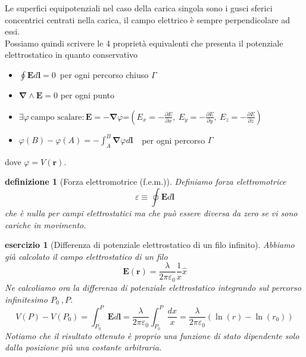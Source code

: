 \documentclass[10pt,a4paper]{article}
\newtheorem{esercizio}{esercizio}
\newtheorem{definizione}{definizione}
\begin{document}
Le superfici equipotenziali nel caso della carica singola sono i gusci sferici concentrici centrati nella carica, il campo elettrico è sempre perpendicolare ad essi.\\
Possiamo quindi scrivere le 4 proprietà equivalenti che presenta il potenziale elettrostatico in quanto conservativo
\begin{itemize}
	\item \(\oint \mathbf{E}d\mathbf{l} = 0 \)\ per ogni percorso chiuso $\Gamma$ 
	\item \(\mathbf{\nabla}\wedge\mathbf{E} = 0\) per ogni punto
	\item \(\exists\varphi\  \text{campo scalare} : \mathbf{E}=-\mathbf{\nabla}\varphi\)=$\left(E_x = -\frac{\partial E}{\partial x},\ E_y= - \frac{\partial E}{\partial y},\ E_z= -\frac{\partial E}{\partial z}\right)$
	\item \(\varphi(B)-\varphi(A) = -\int_{A}^{B}\mathbf{\nabla}\varphi d\mathbf{l}\ \) \ per ogni percorso $\Gamma$ 
\end{itemize}
dove $\varphi = V(\mathbf{r})$.
\begin{definizione}[Forza elettromotrice (f.e.m.)]
Definiamo forza elettromotrice
\[\varepsilon \equiv \oint \mathbf{E}d\mathbf{l}\]
che è nulla per campi elettrostatici ma che può essere diversa da zero se vi sono cariche in movimento.
\end{definizione}
\begin{esercizio}[Differenza di potenziale elettrostatico di un filo infinito]
Abbiamo già calcolato il campo elettrostatico di un filo
\[\mathbf{E}(\mathbf{r}) = \frac{\lambda}{2\pi\varepsilon_0}\frac{1}{x}\hat{x}\]
Ne calcoliamo ora la differenza di potenziale elettrostatico integrando sul percorso infinitesimo \(P_0\ , P\). 
\[V(P)-V(P_0) = \int_{P_0}^{P}\mathbf{E}d\mathbf{l} = \frac{\lambda}{2\pi\varepsilon_0} \int_{P_0}^{P}\frac{dx}{x}= \frac{\lambda}{2\pi\varepsilon_0} \left(\ln(r)-\ln(r_0)\right)\]
Notiamo che il risultato ottenuto è proprio una funzione di stato dipendente solo dalla posizione più una costante arbitraria.  
\end{esercizio}
\end{document}
